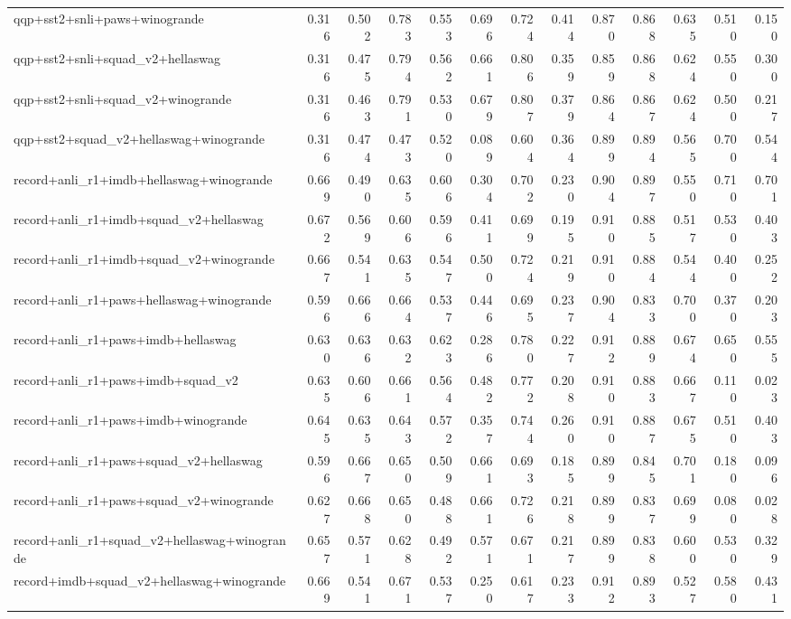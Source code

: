 \begin{table}[t]
\begin{tabular}{lrrrrrrrrrrrr}
    qqp+sst2+snli+paws+winogrande & 0.316 & 0.502 & 0.783 & 0.553 & 0.696 & 0.724 & 0.414 & 0.870 & 0.868 & 0.635 & 0.510 & 0.150 \\
    qqp+sst2+snli+squad\_v2+hellaswag & 0.316 & 0.475 & 0.794 & 0.562 & 0.661 & 0.806 & 0.359 & 0.859 & 0.868 & 0.624 & 0.550 & 0.300 \\
    qqp+sst2+snli+squad\_v2+winogrande & 0.316 & 0.463 & 0.791 & 0.530 & 0.679 & 0.807 & 0.379 & 0.864 & 0.867 & 0.624 & 0.500 & 0.217 \\
    qqp+sst2+squad\_v2+hellaswag+winogrande & 0.316 & 0.474 & 0.473 & 0.520 & 0.089 & 0.604 & 0.364 & 0.899 & 0.894 & 0.565 & 0.700 & 0.544 \\
    record+anli\_r1+imdb+hellaswag+winogrande & 0.669 & 0.490 & 0.635 & 0.606 & 0.304 & 0.702 & 0.230 & 0.904 & 0.897 & 0.550 & 0.710 & 0.701 \\
    record+anli\_r1+imdb+squad\_v2+hellaswag & 0.672 & 0.569 & 0.606 & 0.596 & 0.411 & 0.699 & 0.195 & 0.910 & 0.885 & 0.517 & 0.530 & 0.403 \\
    record+anli\_r1+imdb+squad\_v2+winogrande & 0.667 & 0.541 & 0.635 & 0.547 & 0.500 & 0.724 & 0.219 & 0.910 & 0.884 & 0.544 & 0.400 & 0.252 \\
    record+anli\_r1+paws+hellaswag+winogrande & 0.596 & 0.666 & 0.664 & 0.537 & 0.446 & 0.695 & 0.237 & 0.904 & 0.833 & 0.700 & 0.370 & 0.203 \\
    record+anli\_r1+paws+imdb+hellaswag & 0.630 & 0.636 & 0.632 & 0.623 & 0.286 & 0.780 & 0.227 & 0.912 & 0.889 & 0.674 & 0.650 & 0.555 \\
    record+anli\_r1+paws+imdb+squad\_v2 & 0.635 & 0.606 & 0.661 & 0.564 & 0.482 & 0.772 & 0.208 & 0.910 & 0.883 & 0.667 & 0.110 & 0.023 \\
    record+anli\_r1+paws+imdb+winogrande & 0.645 & 0.635 & 0.643 & 0.572 & 0.357 & 0.744 & 0.260 & 0.910 & 0.887 & 0.675 & 0.510 & 0.403 \\
    record+anli\_r1+paws+squad\_v2+hellaswag & 0.596 & 0.667 & 0.650 & 0.509 & 0.661 & 0.693 & 0.185 & 0.899 & 0.845 & 0.701 & 0.180 & 0.096 \\
    record+anli\_r1+paws+squad\_v2+winogrande & 0.627 & 0.668 & 0.650 & 0.488 & 0.661 & 0.726 & 0.218 & 0.899 & 0.837 & 0.699 & 0.080 & 0.028 \\
    record+anli\_r1+squad\_v2+hellaswag+winogrande & 0.657 & 0.571 & 0.628 & 0.492 & 0.571 & 0.671 & 0.217 & 0.899 & 0.838 & 0.600 & 0.530 & 0.329 \\
    record+imdb+squad\_v2+hellaswag+winogrande & 0.669 & 0.541 & 0.671 & 0.537 & 0.250 & 0.617 & 0.233 & 0.912 & 0.893 & 0.527 & 0.580 & 0.431 \\

\end{tabular}
\end{table}
